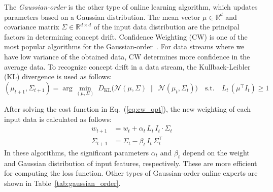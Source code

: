 \documentclass[12pt,a4paper]{article}
\begin{document}
	The \textit{Gaussian-order} is the other type of online learning algorithm, which updates parameters based on a Gaussian distribution. The mean vector $\mu \in \mathbb{R}^d$ and covariance matrix $\Sigma \in \mathbb{R}^{d\times d}$ of the input data distribution are the principal factors in determining concept drift. Confidence Weighting (CW) is one of the most popular algorithms for the Gaussian-order~\cite{Dredze2008}. For data streams where we have low variance of the obtained data, CW determines more confidence in the average data. To recognize concept drift in a data stream, the Kullback-Leibler (KL) divergence is used as follows:
	\begin{equation}
		(\mu_{t+1}, \Sigma_{t+1}) = \arg\min_{(\mu,\Sigma)}\; D_{\mathrm{KL}}\bigl(\mathcal{N}(\mu, \Sigma) \;\|\; \mathcal{N}(\mu_t, \Sigma_t)\bigr)
		\quad \text{s.t.} \quad L_t\,(\mu^{\top} I_t) \geq 1
		\label{eq:cw_opt}
	\end{equation}
	
	After solving the cost function in Eq.~(\ref{eq:cw_opt}), the new weighting of each input data is calculated as follows:
	\begin{align}
		w_{t+1} &= w_t + \alpha_t\, L_t\, I_t \cdot \Sigma_t \label{eq:cw_w} \\
		\Sigma_{t+1} &= \Sigma_t - \beta_t\, I_t\, \Sigma_t^{\top} \label{eq:cw_sigma}
	\end{align}
	In these algorithms, the significant parameters $\alpha_t$ and $\beta_t$ depend on the weight and Gaussian distribution of input features, respectively. These are more efficient for computing the loss function. Other types of Gaussian-order online experts are shown in Table~\ref{tab:gaussian_order}.
	
\end{document}
